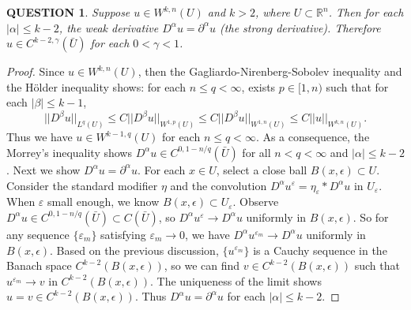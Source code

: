 \documentclass[12pt]{article}
\renewcommand{\(}{\left(}%
\renewcommand{\)}{\right)}%
\renewcommand{\[}{\left[}%
\renewcommand{\]}{\right]}%
\renewcommand{\r}{\mathbb{R}}
\newtheorem{question}{QUESTION}[section]}
\newtheorem{proof}{Proof.}}
\begin{document}
  \begin{question}
   Suppose $u\in W^{k,n}(U)$ and $k> 2$, where $U\subset \r^n$. Then for each $|\alpha|\leq k-2$, the weak derivative $D^\alpha u=\partial^\alpha u$ (the strong derivative). Therefore $u\in C^{k-2,\gamma}(\bar{U})$ for each $0<\gamma<1$.
  \end{question}
  \begin{proof}
   Since $u\in W^{k,n}(U)$, then the {\sffamily Gagliardo-Nirenberg-Sobolev inequality} and the {\sffamily H\"older inequality} shows: for each $n\leq q<\infty$, exists $p\in[1,n)$ such that for each $|\beta|\leq k-1$,
   \begin{equation*}
    ||D^\beta u||_{L^q(U)}\leq C||D^\beta u||_{W^{1,p}(U)}  \leq C||D^\beta u||_{W^{1,n}(U)}\leq C||u||_{W^{k,n}(U)}.
   \end{equation*}
    Thus we have $u\in W^{k-1,q}(U)$ for each $n\leq q<\infty$. As a consequence, the {\sffamily Morrey's inequality} shows  $D^\alpha u\in C^{0,1-n/q}(\bar{U})$ for all $n<q<\infty$ and $|\alpha |\leq k-2$. Next we show $D^\alpha u=\partial^\alpha u$. For each $x\in U$, select a close ball $B(x,\epsilon )\subset U$. Consider the standard modifier $\eta$ and the convolution $D^\alpha u^\varepsilon=\eta_\varepsilon*D^\alpha u$ in $U_\varepsilon$. When $\varepsilon$ small enough, we know $B(x,\epsilon )\subset U_\varepsilon$. Observe $D^\alpha u\in C^{0,1-n/q}(\bar{U})\subset C(\bar{ U})$, so $D^\alpha u^\varepsilon\to D^\alpha u$ uniformly in $B(x,\epsilon )$.  So for any sequence $\{\varepsilon_m \}$ satisfying $\varepsilon_m\to 0$, we have $D^\alpha u^{\varepsilon_{m}}\to D^\alpha u$ uniformly in $B(x,\epsilon )$. Based on the previous discussion, $\{u^{\varepsilon_m}\}$ is a Cauchy sequence in the Banach space $C^{k-2}(B(x,\epsilon ) )$, so we can find $v\in C^{k-2}(B(x,\epsilon ) )$ such that $u^{\varepsilon_m}\to v$ in $C^{k-2}(B(x,\epsilon ) )$. The uniqueness of the limit shows $u=v\in C^{k-2}(B(x,\epsilon ) )$. Thus $D^\alpha u=\partial^\alpha u$ for each $|\alpha |\leq k-2$.
  \end{proof}
\end{document}
